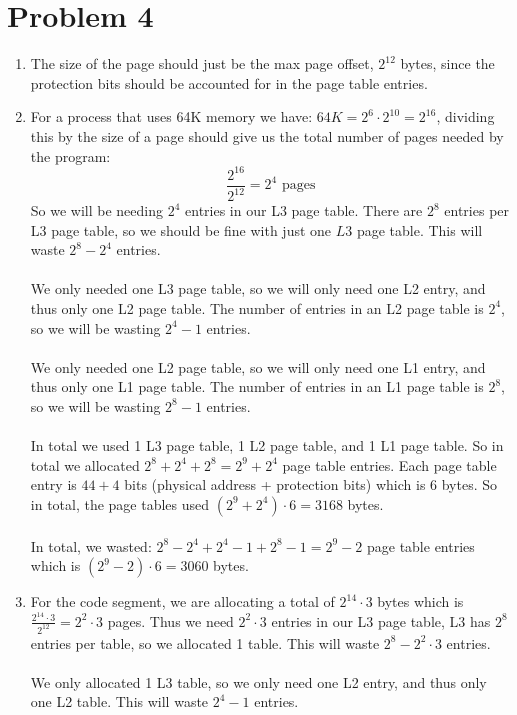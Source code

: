 \documentclass{article}
\begin{document}
\section*{Problem 4}
\begin{enumerate}[label=\alph*)]
\item The size of the page should just be the max page offset, $2^{12}$ bytes, since the protection bits should be accounted for in the page table entries. 
\item  For a process that uses 64K memory we have: $64K = 2^6 \cdot 2^{10} = 2^{16}$, dividing this by the size of a page should give us the total number of pages needed by the program: \\
\[
\frac{2^{16}}{2^{12}} = 2^4 \mbox{ pages}
\]
So we will be needing $2^4$ entries in our L3 page table. There are $2^8$ entries per L3 page table, so we should be fine with just one $L3$ page table. This will waste $2^8 - 2^4$ entries. \\\\
We only needed one L3 page table, so we will only need one L2 entry, and thus only one L2 page table. The number of entries in an L2 page table is $2^4$, so we will be wasting $2^4 - 1$ entries. \\\\
We only needed one L2 page table, so we will only need one L1 entry, and thus only one L1 page table. The number of entries in an L1 page table is $2^8$, so we will be wasting $2^8 - 1$ entries. \\\\
In total we used 1 L3 page table, 1 L2 page table, and  1 L1 page table. So in total we allocated $2^8 + 2^4 + 2^8 = 2^9 + 2^4$ page table entries. Each page table entry is $44 + 4$ bits (physical address + protection bits) which is 6 bytes. So in total, the page tables used $(2^9 + 2^4) \cdot 6 = 3168$ bytes.\\\\ In total, we wasted: $2^8 - 2^4 + 2^4 - 1 + 2^8 - 1 = 2^9 - 2$ page table entries which is $(2^9 - 2) \cdot 6 = 3060$ bytes. \\
\item  For the code segment, we are allocating a total of $2^{14} \cdot 3$ bytes which is $\frac{2^{14} \cdot 3 }{2^12} = 2^2 \cdot 3$ pages. Thus we need $2^2 \cdot 3$ entries in our L3 page table, L3 has $2^8$ entries per table, so we allocated 1 table. This will waste $2^8 - 2^2 \cdot 3$ entries. \\\\
We only allocated 1 L3 table, so we only need one L2 entry, and thus only one L2 table. This will waste $2^4 - 1$ entries. \\\\

\end{enumerate}
\end{document}
